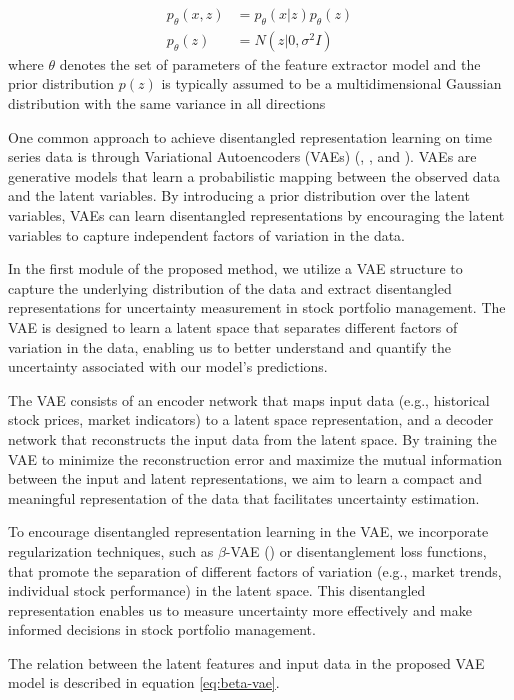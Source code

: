 \begin{align}
	p_\theta(x,z) &= p_\theta(x|z) p_\theta(z) \label{eq:1}\\
	p_\theta(z) &= N(z|0, \sigma^2 I) \label{eq:2}
\end{align}
where $\theta$ denotes the set of parameters of the feature extractor model and the prior distribution $p(z)$ is typically assumed to be a multidimensional Gaussian distribution with the same variance in all directions 


One common approach to achieve disentangled representation learning on time series data is through Variational Autoencoders (VAEs) (\citet{duan2019unsupervised}, \citet{li2022towards}, and \citet{li2021learning}). VAEs are generative models that learn a probabilistic mapping between the observed data and the latent variables. By introducing a prior distribution over the latent variables, VAEs can learn disentangled representations by encouraging the latent variables to capture independent factors of variation in the data.

In the first module of the proposed method, we utilize a VAE structure to capture the underlying distribution of the data and extract disentangled representations for uncertainty measurement in stock portfolio management. The VAE is designed to learn a latent space that separates different factors of variation in the data, enabling us to better understand and quantify the uncertainty associated with our model's predictions.

The VAE consists of an encoder network that maps input data (e.g., historical stock prices, market indicators) to a latent space representation, and a decoder network that reconstructs the input data from the latent space. By training the VAE to minimize the reconstruction error and maximize the mutual information between the input and latent representations, we aim to learn a compact and meaningful representation of the data that facilitates uncertainty estimation.

To encourage disentangled representation learning in the VAE, we incorporate regularization techniques, such as $\beta$-VAE (\citet{burgess2018understanding}) or disentanglement loss functions, that promote the separation of different factors of variation (e.g., market trends, individual stock performance) in the latent space. This disentangled representation enables us to measure uncertainty more effectively and make informed decisions in stock portfolio management.

The relation between the latent features and input data in the proposed VAE model is described in equation \eqref{eq:beta-vae}.

